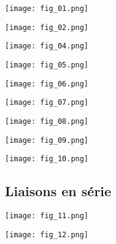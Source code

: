 \begin{multicols}{2}
\begin{center}
\texttt{[image: fig\_01.png]}
\end{center}

\begin{center}
\texttt{[image: fig\_02.png]}
\end{center}

\begin{center}
\end{center}

\begin{center}
\texttt{[image: fig\_04.png]}
\end{center}

\begin{center}
\texttt{[image: fig\_05.png]}
\end{center}

\begin{center}
\texttt{[image: fig\_06.png]}
\end{center}

\begin{center}
\texttt{[image: fig\_07.png]}
\end{center}

\begin{center}
\texttt{[image: fig\_08.png]}
\end{center}



\begin{center}
\texttt{[image: fig\_09.png]}
\end{center}

\begin{center}
\texttt{[image: fig\_10.png]}
\end{center}

\end{multicols}
\subsection*{Liaisons en série}


\begin{multicols}{2}
\begin{center}
\texttt{[image: fig\_11.png]}
\end{center}
\begin{center}
\texttt{[image: fig\_12.png]}
\end{center}
\end{multicols}

